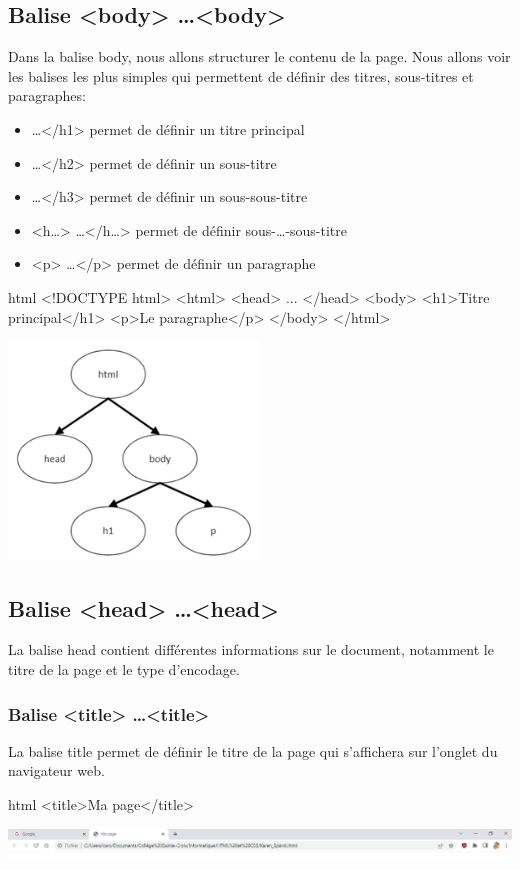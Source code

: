 \documentclass[a4paper,11pt]{article}
\begin{document}
\subsection{Balise <body> \dots <body>}
Dans la balise body, nous allons structurer le contenu de la page. Nous allons voir les balises les plus simples qui permettent de définir des titres, sous-titres et paragraphes:
\begin{itemize}
\item <h1> \dots </h1>  permet de définir un titre principal
\item <h2> \dots </h2>  permet de définir un sous-titre
\item <h3> \dots </h3>  permet de définir un sous-sous-titre
\item <h\dots> \dots </h\dots>  permet de définir  sous-\dots-sous-titre
\item  <p> \dots </p>  permet de définir un paragraphe
\end{itemize}
\begin{multicols}{2}
\begin{code}{html}
<!DOCTYPE html>
<html>
  <head> ... </head>
  <body>
    <h1>Titre principal</h1>
    <p>Le paragraphe</p>
  </body>
</html>
\end{code}
\includegraphics[width=0.5\textwidth]{images/balise-body.png} \\
\end{multicols}

\subsection{Balise <head> \dots <head>}
La balise head contient différentes informations sur le document, notamment le titre de la page et le type d'encodage.

\subsubsection{Balise <title> \dots <title>}
La balise title permet de définir le titre de la page qui s'affichera sur l'onglet du navigateur web.
\begin{code}{html}
<title>Ma page</title>
\end{code}
\includegraphics[width=1.0\textwidth]{images/barre-titre.png}
\end{document}
